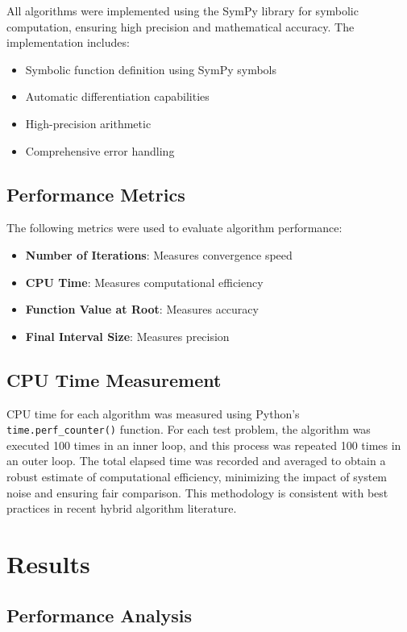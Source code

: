 \documentclass[reprint, amsmath, amssymb, aps, prl]{revtex4-2}
\begin{document}
All algorithms were implemented using the SymPy library for symbolic computation, ensuring high precision and mathematical accuracy. The implementation includes:

\begin{itemize}
    \item Symbolic function definition using SymPy symbols
    \item Automatic differentiation capabilities
    \item High-precision arithmetic
    \item Comprehensive error handling
\end{itemize}

\subsection{Performance Metrics}

The following metrics were used to evaluate algorithm performance:

\begin{itemize}
    \item \textbf{Number of Iterations}: Measures convergence speed
    \item \textbf{CPU Time}: Measures computational efficiency
    \item \textbf{Function Value at Root}: Measures accuracy
    \item \textbf{Final Interval Size}: Measures precision
\end{itemize}

\subsection{CPU Time Measurement}

CPU time for each algorithm was measured using Python's \texttt{time.perf\_counter()} function. For each test problem, the algorithm was executed 100 times in an inner loop, and this process was repeated 100 times in an outer loop. The total elapsed time was recorded and averaged to obtain a robust estimate of computational efficiency, minimizing the impact of system noise and ensuring fair comparison. This methodology is consistent with best practices in recent hybrid algorithm literature.

\section{Results}

\subsection{Performance Analysis}
\end{document}
